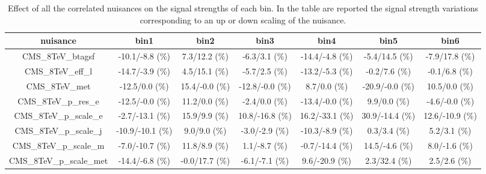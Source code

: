 \begin{table}
\caption{Effect of all the correlated nuisances on the signal strengths of each bin. In the table are reported the signal strength variations corresponding to an up or down scaling of the nuisance.}\label{table:corr_syst}
\centering
\small{
\begin{tabular}{|c|cccccc|}
\hline
\bf{nuisance} & \bf{bin1} & \bf{bin2} & \bf{bin3} & \bf{bin4} & \bf{bin5} & \bf{bin6} \\ 
\hline 
\hline 
CMS\_8TeV\_btagsf & -10.1/-8.8 (\%) & 7.3/12.2 (\%) & -6.3/3.1 (\%) & -14.4/-4.8 (\%) & -5.4/14.5 (\%) & -7.9/17.8 (\%) \\ 
CMS\_8TeV\_eff\_l & -14.7/-3.9 (\%) & 4.5/15.1 (\%) & -5.7/2.5 (\%) & -13.2/-5.3 (\%) & -0.2/7.6 (\%) & -0.1/6.8 (\%) \\ 
CMS\_8TeV\_met & -12.5/0.0 (\%) & 15.4/-0.0 (\%) & -12.8/-0.0 (\%) & 8.7/0.0 (\%) & -20.9/-0.0 (\%) & 10.5/0.0 (\%) \\ 
CMS\_8TeV\_p\_res\_e & -12.5/-0.0 (\%) & 11.2/0.0 (\%) & -2.4/0.0 (\%) & -13.4/-0.0 (\%) & 9.9/0.0 (\%) & -4.6/-0.0 (\%) \\ 
CMS\_8TeV\_p\_scale\_e & -2.7/-13.1 (\%) & 15.9/9.9 (\%) & 10.8/-16.8 (\%) & 16.2/-33.1 (\%) & 30.9/-14.4 (\%) & 12.6/-10.9 (\%) \\ 
CMS\_8TeV\_p\_scale\_j & -10.9/-10.1 (\%) & 9.0/9.0 (\%) & -3.0/-2.9 (\%) & -10.3/-8.9 (\%) & 0.3/3.4 (\%) & 5.2/3.1 (\%) \\
CMS\_8TeV\_p\_scale\_m & -7.0/-10.7 (\%) & 11.8/8.9 (\%) & 1.1/-8.7 (\%) & -0.7/-14.4 (\%) & 14.5/-4.6 (\%) & 8.0/-1.6 (\%) \\ 
CMS\_8TeV\_p\_scale\_met & -14.4/-6.8 (\%) & -0.0/17.7 (\%) & -6.1/-7.1 (\%) & 9.6/-20.9 (\%) & 2.3/32.4 (\%) & 2.5/2.6 (\%) \\ 

\hline
\end{tabular}
}
\end{table}
